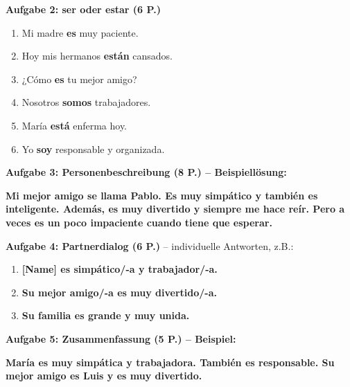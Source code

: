 \documentclass[11pt,a4paper]{article}
\newcommand{\lsg}[1]{\textcolor{loesung}{\textbf{#1}}}
\begin{document}
\begin{gruppenbox}
\vspace{0.5em}
\textbf{Aufgabe 2: ser oder estar (6 P.)}
\begin{enumerate}[label=\alph*), leftmargin=2em, nosep]
    \item Mi madre \lsg{es} muy paciente.
    \item Hoy mis hermanos \lsg{están} cansados.
    \item ¿Cómo \lsg{es} tu mejor amigo?
    \item Nosotros \lsg{somos} trabajadores.
    \item María \lsg{está} enferma hoy.
    \item Yo \lsg{soy} responsable y organizada.
\end{enumerate}

\vspace{0.5em}
\textbf{Aufgabe 3: Personenbeschreibung (8 P.) -- Beispiellösung:}

\lsg{Mi mejor amigo se llama Pablo. Es muy simpático y también es inteligente. Además, es muy divertido y siempre me hace reír. Pero a veces es un poco impaciente cuando tiene que esperar.}

\vspace{0.5em}
\textbf{Aufgabe 4: Partnerdialog (6 P.)} -- individuelle Antworten, z.B.:
\begin{enumerate}[leftmargin=2em, nosep]
    \item \lsg{[Name] es simpático/-a y trabajador/-a.}
    \item \lsg{Su mejor amigo/-a es muy divertido/-a.}
    \item \lsg{Su familia es grande y muy unida.}
\end{enumerate}

\vspace{0.5em}
\textbf{Aufgabe 5: Zusammenfassung (5 P.) -- Beispiel:}

\lsg{María es muy simpática y trabajadora. También es responsable. Su mejor amigo es Luis y es muy divertido.}

\end{gruppenbox}

\vspace{1em}
\end{document}

